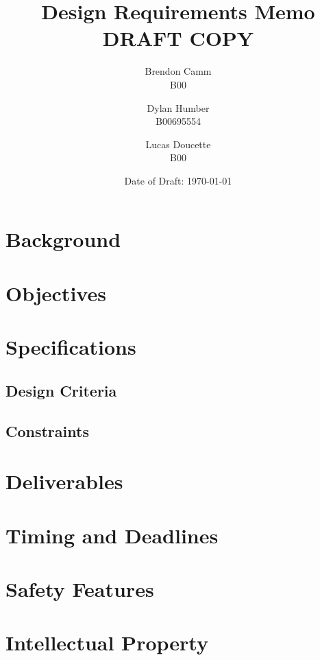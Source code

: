 \documentclass[draft]{article}
\title{Design Requirements Memo \\ DRAFT COPY}
\author{Brendon Camm \\ B00 \and Dylan Humber \\ B00695554	\and Lucas Doucette \\ B00}
\date{Date of Draft: \today}
\begin{document}
\maketitle

\section{Background}
\section{Objectives}
\section{Specifications}
\subsection{Design Criteria}
\subsection{Constraints}
\section{Deliverables}
\section{Timing and Deadlines}
\section{Safety Features}
\section{Intellectual Property}
\end{document}
